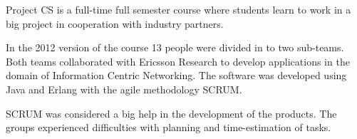Project CS is a full-time full semester course where students learn to work in a big project in cooperation with industry partners.

In the 2012 version of the course 13 people were divided in to two sub-teams. Both teams collaborated with Ericsson Research to develop applications in the domain of Information Centric Networking. The software was developed using Java and Erlang with the agile methodology SCRUM. 

SCRUM was considered a big help in the development of the products.
The groups experienced difficulties with planning and time-estimation of tasks.